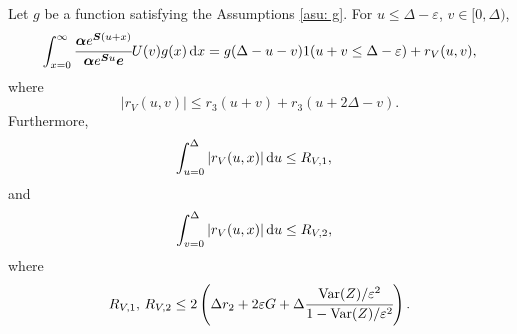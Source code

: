 
\begin{cor}\label{cor: cond bnd 2 U}
	Let \(g\) be a function satisfying the Assumptions \ref{asu: g}. For \(u\leq \Delta-\varepsilon \), \(v\in[ 0,\Delta)\), 
	\[\int_{x=0}^\infty \cfrac{\boldsymbol \alpha  e^{\boldsymbol{S} (u+x)} }{\boldsymbol \alpha  e^{\boldsymbol{S} u} \boldsymbol e} U(v)g(x)\, \mathrm{d} x = g(\Delta-u-v) 1(u+v\leq\Delta-\varepsilon) + r_V (u,v),\]
	where 
	\[\left|r_V (u,v)\right|\leq r_3 (u+v) + r_3 (u+2\Delta - v).\]
	Furthermore,  
	\begin{align*}
		&\int_{u=0}^{\Delta}| r_V(u,x)|\, \mathrm{d} u
		\leq R_{V,1},
	\end{align*}
	and
	\begin{align*}
		&\int_{v=0}^{\Delta}| r_V(u,x)|\, \mathrm{d} u
		\leq R_{V,2},
	\end{align*}
	where 
	\[R_{V,1},\, R_{V,2} \leq 2\left(\Delta r_2 + 2\varepsilon G + \Delta\cfrac{\mathrm{Var}(Z)/\varepsilon^2}{1-\mathrm{Var}(Z)/\varepsilon^2}\right).\]
\end{cor}
